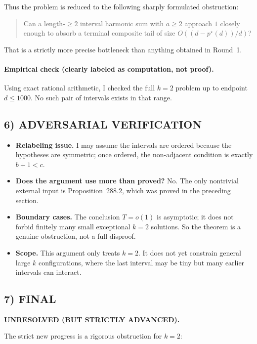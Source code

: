 Thus the problem is reduced to the following sharply formulated obstruction:

\begin{quote}
	Can a length-$\ge 2$ interval harmonic sum with $a\ge 2$ approach $1$ closely enough to absorb a terminal composite tail of size $O((d-p^\star(d))/d)$?
\end{quote}

That is a strictly more precise bottleneck than anything obtained in Round~1.

\paragraph{Empirical check (clearly labeled as computation, not proof).}
Using exact rational arithmetic, I checked the full $k=2$ problem up to endpoint $d\le 1000$. No such pair of intervals exists in that range.

\subsection*{6) ADVERSARIAL VERIFICATION}
\begin{itemize}
	\item \textbf{Relabeling issue.} I may assume the intervals are ordered because the hypotheses are symmetric; once ordered, the non-adjacent condition is exactly $b+1<c$.
	
	\item \textbf{Does the argument use more than proved?} No. The only nontrivial external input is Proposition~288.2, which was proved in the preceding section.
	
	\item \textbf{Boundary cases.} The conclusion $T=o(1)$ is asymptotic; it does not forbid finitely many small exceptional $k=2$ solutions. So the theorem is a genuine obstruction, not a full disproof.
	
	\item \textbf{Scope.} This argument only treats $k=2$. It does not yet constrain general large $k$ configurations, where the last interval may be tiny but many earlier intervals can interact.
\end{itemize}

\subsection*{7) FINAL}
\textbf{UNRESOLVED (BUT STRICTLY ADVANCED).}

The strict new progress is a rigorous obstruction for $k=2$:

